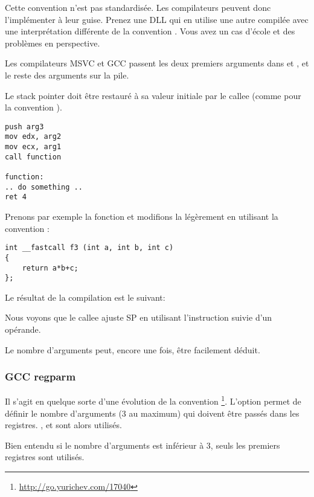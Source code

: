 Cette convention n'est pas standardisée. Les compilateurs peuvent donc l'implémenter à leur guise.
Prenez une DLL qui en utilise une autre compilée avec une interprétation différente de la convention 
. Vous avez un cas d'école et des problèmes en perspective.

Les compilateurs MSVC et GCC passent les deux premiers arguments dans \ECX et \EDX, et le reste des
arguments sur la pile.

Le \gls{stack pointer} doit être restauré à sa valeur initiale par le \gls{callee} 
(comme pour la convention ).

\begin{lstlisting}[caption=fastcall,style=customasmx86]
push arg3
mov edx, arg2
mov ecx, arg1
call function

function:
.. do something ..
ret 4
\end{lstlisting}

Prenons par exemple la fonction  et modifions la légèrement en utilisant la convention  :

\begin{lstlisting}[style=customc]
int __fastcall f3 (int a, int b, int c)
{
	return a*b+c;
};
\end{lstlisting}

Le résultat de la compilation est le suivant:



Nous voyons que le \gls{callee} ajuste \ac{SP} en utilisant l'instruction  suivie d'un opérande.

Le nombre d'arguments peut, encore une fois, être facilement déduit.

\subsubsection{GCC regparm}

\newcommand{\URLREGPARMM}{\url{http://go.yurichev.com/17040}}

Il s'agit en quelque sorte d'une évolution de la convention \footnote{\URLREGPARMM}.
L'option  permet de définir le nombre d'arguments (3 au maximum) qui doivent être passés 
dans les registres. \EAX, \EDX et \ECX sont alors utilisés.

Bien entendu si le nombre d'arguments est inférieur à 3, seuls les premiers registres sont utilisés.

